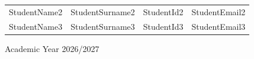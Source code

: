 \documentclass[a4paper,11pt]{article}
\newcommand{\AcademicYear}{2026/2027}
\begin{document}
\begin{titlepage}
\begin{center}
{\begin{tabular}{llll}
StudentName2 & StudentSurname2 & StudentId2 & StudentEmail2 \\

StudentName3 & StudentSurname3 & StudentId3 & StudentEmail3 \\

\end{tabular}
}


\vfill

{\large Academic Year \AcademicYear}

\end{center}

\end{titlepage}


%
%
%
%

\clearpage




\tableofcontents



\clearpage
\listoffigures



\clearpage
\listoftables


%
%
%
%
%
%

\clearpage
{}
\setcounter{page}{1}

\pagestyle{fancy}
\end{document}
